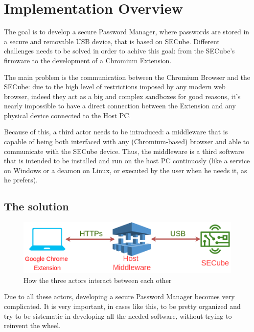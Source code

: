 \chapter{Implementation Overview}
\label{sec:implementation-overview}

The goal is to develop a secure Password Manager, where passwords are stored in a secure and removable USB device, that is based on SECube. Different challenges needs to be solved in order to achive this goal: from the SECube's firmware to the development of a Chromium Extension. \bigskip

The main problem is the communication between the Chromium Browser and the SECube: due to the high level of restrictions imposed by any modern web browser, indeed they act as a big and complex sandboxes for good reasons, it's nearly impossible to have a direct connection between the Extension and any physical device connected to the Host PC. \bigskip

Because of this, a third actor needs to be introduced: a middleware that is capable of being both interfaced with any (Chromium-based) browser and able to communicate with the SECube device. Thus, the middleware is a third software that is intended to be installed and run on the host PC continuosly (like a service on Windows or a deamon on Linux, or executed by the user when he needs it, as he prefers). \bigskip

\section{The solution}

\begin{figure}[H]
	\centering
	\includegraphics[width=0.9\linewidth]{images/overview}
	\caption{How the three actors interact between each other}
	\label{fig:overview}
\end{figure}

Due to all these actors, developing a secure Password Manager becomes very complicated. It is very important, in cases like this, to be pretty organized and try to be sistematic in developing all the needed software, without trying to reinvent the wheel. \bigskip

